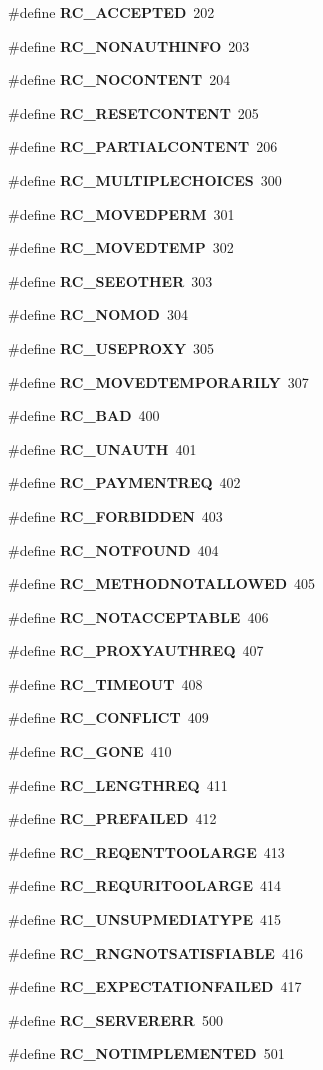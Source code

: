 \begin{CompactItemize}
\#define {\bf RC\_\-ACCEPTED}~202
\item 
\#define {\bf RC\_\-NONAUTHINFO}~203
\item 
\#define {\bf RC\_\-NOCONTENT}~204
\item 
\#define {\bf RC\_\-RESETCONTENT}~205
\item 
\#define {\bf RC\_\-PARTIALCONTENT}~206
\item 
\#define {\bf RC\_\-MULTIPLECHOICES}~300
\item 
\#define {\bf RC\_\-MOVEDPERM}~301
\item 
\#define {\bf RC\_\-MOVEDTEMP}~302
\item 
\#define {\bf RC\_\-SEEOTHER}~303
\item 
\#define {\bf RC\_\-NOMOD}~304
\item 
\#define {\bf RC\_\-USEPROXY}~305
\item 
\#define {\bf RC\_\-MOVEDTEMPORARILY}~307
\item 
\#define {\bf RC\_\-BAD}~400
\item 
\#define {\bf RC\_\-UNAUTH}~401
\item 
\#define {\bf RC\_\-PAYMENTREQ}~402
\item 
\#define {\bf RC\_\-FORBIDDEN}~403
\item 
\#define {\bf RC\_\-NOTFOUND}~404
\item 
\#define {\bf RC\_\-METHODNOTALLOWED}~405
\item 
\#define {\bf RC\_\-NOTACCEPTABLE}~406
\item 
\#define {\bf RC\_\-PROXYAUTHREQ}~407
\item 
\#define {\bf RC\_\-TIMEOUT}~408
\item 
\#define {\bf RC\_\-CONFLICT}~409
\item 
\#define {\bf RC\_\-GONE}~410
\item 
\#define {\bf RC\_\-LENGTHREQ}~411
\item 
\#define {\bf RC\_\-PREFAILED}~412
\item 
\#define {\bf RC\_\-REQENTTOOLARGE}~413
\item 
\#define {\bf RC\_\-REQURITOOLARGE}~414
\item 
\#define {\bf RC\_\-UNSUPMEDIATYPE}~415
\item 
\#define {\bf RC\_\-RNGNOTSATISFIABLE}~416
\item 
\#define {\bf RC\_\-EXPECTATIONFAILED}~417
\item 
\#define {\bf RC\_\-SERVERERR}~500
\item 
\#define {\bf RC\_\-NOTIMPLEMENTED}~501

\end{CompactItemize}
